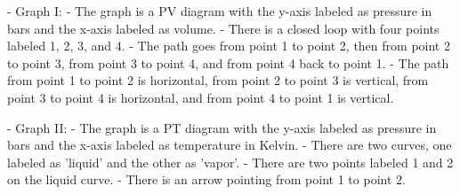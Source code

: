 - Graph I:
  - The graph is a PV diagram with the y-axis labeled as pressure in bars and the x-axis labeled as volume.
  - There is a closed loop with four points labeled 1, 2, 3, and 4.
  - The path goes from point 1 to point 2, then from point 2 to point 3, from point 3 to point 4, and from point 4 back to point 1.
  - The path from point 1 to point 2 is horizontal, from point 2 to point 3 is vertical, from point 3 to point 4 is horizontal, and from point 4 to point 1 is vertical.

- Graph II:
  - The graph is a PT diagram with the y-axis labeled as pressure in bars and the x-axis labeled as temperature in Kelvin.
  - There are two curves, one labeled as 'liquid' and the other as 'vapor'.
  - There are two points labeled 1 and 2 on the liquid curve.
  - There is an arrow pointing from point 1 to point 2.